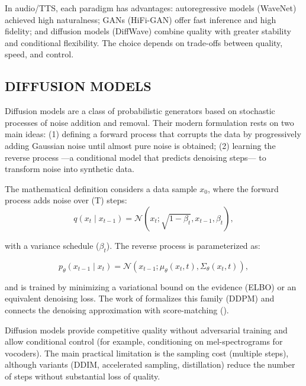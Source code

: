In audio/TTS, each paradigm has advantages: autoregressive models (WaveNet) achieved high naturalness; GANs (HiFi-GAN) offer fast inference and high fidelity; and diffusion models (DiffWave) combine quality with greater stability and conditional flexibility. The choice depends on trade-offs between quality, speed, and control.

\subsection{DIFFUSION MODELS}
Diffusion models are a class of probabilistic generators based on stochastic processes of noise addition and removal. Their modern formulation rests on two main ideas: (1) defining a forward process that corrupts the data by progressively adding Gaussian noise until almost pure noise is obtained; (2) learning the reverse process ---a conditional model that predicts denoising steps--- to transform noise into synthetic data.

The mathematical definition considers a data sample $x_{0}$, where the forward process adds noise over (T) steps:
\begin{equation}
    q(x_{t}\mid x_{t-1})=\mathcal{N}(x_{t};\sqrt{1-\beta_{t}},x_{t-1},\beta_{t}),
\end{equation}

with a variance schedule (${\beta_{t}}$). The reverse process is parameterized as:

\begin{equation}
    p_{\theta}(x_{t-1}\mid x_{t})=\mathcal{N}(x_{t-1};\mu_{\theta}(x_{t},t),\Sigma_{\theta}(x_{t},t)),
\end{equation}

and is trained by minimizing a variational bound on the evidence (ELBO) or an equivalent denoising loss. The work of \cite{ddpm_diff} formalizes this family (DDPM) and connects the denoising approximation with score-matching (\cite{score_based}).

Diffusion models provide competitive quality without adversarial training and allow conditional control (for example, conditioning on mel-spectrograms for vocoders). The main practical limitation is the sampling cost (multiple steps), although variants (DDIM, accelerated sampling, distillation) reduce the number of steps without substantial loss of quality.
